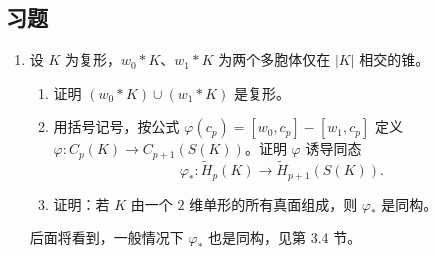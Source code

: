 \subsection*{习题}
\begin{enumerate}
\item 设 $K$ 为复形，$w_0*K$、$w_1*K$ 为两个多胞体仅在 $|K|$ 相交的锥。
\begin{enumerate}[label=(\alph*)]
\item 证明 $(w_0*K)\cup(w_1*K)$ 是复形。
\item 用括号记号，按公式 $\varphi(c_p)=[w_0,c_p]-[w_1,c_p]$ 定义 $\varphi:C_p(K)\to C_{p+1}(S(K))$。证明 $\varphi$ 诱导同态
\[
\varphi_*:\widetilde H_p(K)\longrightarrow\widetilde H_{p+1}(S(K)).
\]
\item 证明：若 $K$ 由一个 $2$ 维单形的所有真面组成，则 $\varphi_*$ 是同构。
\end{enumerate}
后面将看到，一般情况下 $\varphi_*$ 也是同构，见第 3.4 节。
\end{enumerate}
